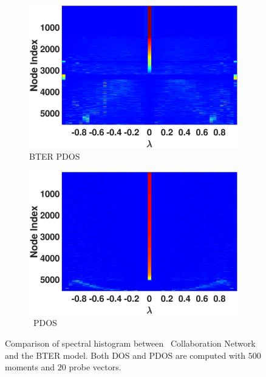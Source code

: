 \begin{figure}[ht]
\begin{subfigure}[t]{0.47\textwidth}
    \captionsetup{justification=centering}
    \includegraphics[width=\textwidth,trim = .4cm 0.5cm 3.5cm 1.3cm,clip]
    {./ndos/pics/bter_ldos}
    \caption{BTER PDOS}
    \label{fig:bter_ldos}
  \end{subfigure}
  \hspace{1cm}
  \begin{subfigure}[t]{0.47\textwidth}
    \centering
    \captionsetup{justification=centering}
    \includegraphics[width=\textwidth,trim = .4cm 0.5cm 3.5cm 1.3cm,clip]
    {./ndos/pics/erdos_ldos}
    \caption{\Erdos\ PDOS}
    \label{fig:erdos_ldos2}
  \end{subfigure}
  \caption{Comparison of spectral histogram between \Erdos\ Collaboration
  Network and the BTER model. Both DOS and PDOS are computed with $500$ moments
  and $20$ probe vectors.} \label{fig:bter}
\end{figure}